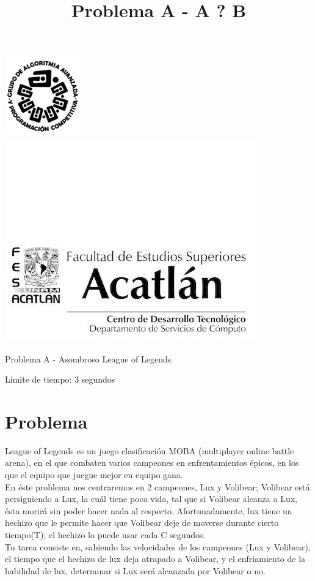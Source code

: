 \documentclass[letter,10pt]{article}
\date{}
\begin{document}
\title{Problema A - A ? B}

\includegraphics[scale=0.6]{logo} \hspace*{9.00cm}
\includegraphics[scale=0.5]{dsc} 
\bigskip
\begin{center}
    \Large Problema A - Asombroso League of Legends
\end{center}

\begin{flushright}
Límite de tiempo: 3 segundos
\par\end{flushright}
\bigskip

\section*{Problema}

League of Legends es un juego clasificación MOBA (multiplayer online battle arena), en el que combaten varios campeones en enfrentamientos épicos, en los que el equipo que juegue mejor en equipo gana.\\[.01cm]
En éste problema nos centraremos en 2 campeones, Lux y Volibear; Volibear está persiguiendo a Lux, la cuál tiene poca vida, tal que si Volibear alcanza a Lux, ésta morirá sin poder hacer nada al respecto.
Afortunadamente, lux tiene un hechizo que le permite hacer que Volibear deje de moverse durante cierto tiempo(T); el hechizo lo puede usar cada C segundos.\\[0.1cm]
Tu tarea consiste en, sabiendo las velocidades de los campeones (Lux y Volibear), el tiempo que el hechizo de lux deja atrapado a Volibear, y el enfriamiento de la habilidad de lux, determinar si Lux será alcanzada por Volibear o no.\\[0.1]
\end{document}
